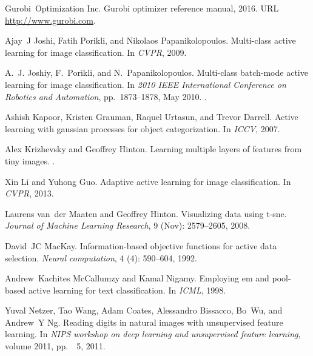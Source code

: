 \documentclass{article} \usepackage{iclr2018_conference,times}
\begin{document}
\begin{thebibliography}{51}
Gurobi~Optimization Inc.
\newblock Gurobi optimizer reference manual, 2016.
\newblock URL \url{http://www.gurobi.com}.

Ajay~J Joshi, Fatih Porikli, and Nikolaos Papanikolopoulos.
\newblock Multi-class active learning for image classification.
\newblock In \emph{CVPR}, 2009.

A.~J. Joshiy, F.~Porikli, and N.~Papanikolopoulos.
\newblock Multi-class batch-mode active learning for image classification.
\newblock In \emph{2010 IEEE International Conference on Robotics and
  Automation}, pp.\  1873--1878, May 2010.
\newblock {}.

Ashish Kapoor, Kristen Grauman, Raquel Urtasun, and Trevor Darrell.
\newblock Active learning with gaussian processes for object categorization.
\newblock In \emph{ICCV}, 2007.

Alex Krizhevsky and Geoffrey Hinton.
\newblock Learning multiple layers of features from tiny images.
.

Xin Li and Yuhong Guo.
\newblock Adaptive active learning for image classification.
\newblock In \emph{CVPR}, 2013.

Laurens van~der Maaten and Geoffrey Hinton.
\newblock Visualizing data using t-sne.
\newblock \emph{Journal of Machine Learning Research}, 9
  (Nov): 2579--2605, 2008.

David~JC MacKay.
\newblock Information-based objective functions for active data selection.
\newblock \emph{Neural computation}, 4 (4): 590--604, 1992.

Andrew~Kachites McCallumzy and Kamal Nigamy.
\newblock Employing em and pool-based active learning for text classification.
\newblock In \emph{ICML}, 1998.

Yuval Netzer, Tao Wang, Adam Coates, Alessandro Bissacco, Bo~Wu, and Andrew~Y
  Ng.
\newblock Reading digits in natural images with unsupervised feature learning.
\newblock In \emph{NIPS workshop on deep learning and unsupervised feature
  learning}, volume 2011, pp.\ ~5, 2011.


\end{thebibliography}
\end{document}
